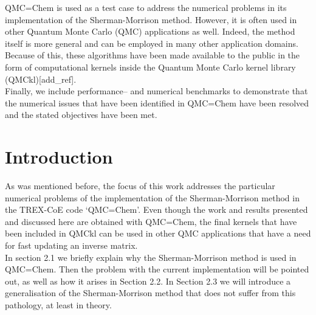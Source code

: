 \documentclass[11pt]{article}
\numberwithin{figure}{section}
\numberwithin{table}{section}
\begin{document}
      QMC=Chem is used as a test case to address the numerical problems in its implementation of the Sherman-Morrison method. However, it is often used in other Quantum Monte Carlo (QMC) applications as well. Indeed, the method itself is more general and can be employed in many other application domains. Because of this, these algorithms have been made available to the public in the form of computational kernels inside the Quantum Monte Carlo kernel library (QMCkl)[add\_ref].\\
      
      Finally, we include performance-- and numerical benchmarks to demonstrate that the numerical issues that have been identified in QMC=Chem have been resolved and the stated objectives have been met.

  \section{Introduction}
	
      As was mentioned before, the focus of this work addresses the particular numerical problems of the implementation of the Sherman-Morrison method in the TREX-CoE code `QMC=Chem'. Even though the work and results presented and discussed here are obtained with QMC=Chem, the final kernels that have been included in QMCkl can be used in other QMC applications that have a need for fast updating an inverse matrix.\\
      
        In section 2.1 we briefly explain why the Sherman-Morrison method is used in QMC=Chem. Then the problem with the current implementation will be pointed out, as well as how it arises in Section 2.2. In Section 2.3 we will introduce a generalisation of the Sherman-Morrison method that does not suffer from this pathology, at least in theory.
	
\end{document}
